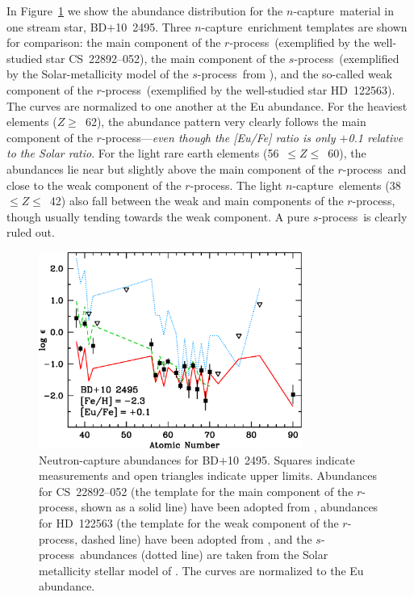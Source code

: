 \documentclass{emulateapj}
\def\rpro{\mbox{$r$-process}}
\def\spro{\mbox{$s$-process}}
\def\ncap{\mbox{$n$-capture}}
\begin{document}
In Figure~\ref{bdp102495plot} we show the abundance distribution
for the \ncap\ material in one stream star, \mbox{BD$+$10~2495}.
Three \ncap\ enrichment templates are shown for comparison:
the main component of the \rpro\ (exemplified by the 
well-studied star \mbox{CS~22892--052}),
the main component of the \spro\ (exemplified by the
Solar-metallicity model of the \spro\ from \citealt{arlandini99}),
and the so-called weak component of the \rpro\
(exemplified by the well-studied star \mbox{HD~122563}).
The curves are normalized to one another at the Eu abundance.
For the heaviest elements ($Z \geq$~62), the abundance pattern
very clearly follows the main component of the \rpro---\textit{even 
though the [Eu/Fe] ratio is only $+$0.1 relative to the Solar ratio}.
For the light rare earth elements (56~$\leq Z \leq$~60),
the abundances lie near but slightly above 
the main component of the \rpro\ and
close to the weak component of the \rpro.
The light \ncap\ elements (38~$\leq Z \leq$~42)
also fall between the weak and main components of the \rpro,
though usually tending towards the weak component.
A pure \spro\ is clearly ruled out.

\begin{figure}
\includegraphics[angle=0,width=3.4in]{fig12.eps}
\caption{
\label{bdp102495plot}
Neutron-capture abundances for \mbox{BD$+$10~2495}.
Squares indicate measurements and open triangles indicate upper limits.
Abundances for \mbox{CS~22892--052} (the template for the
main component of the \rpro, shown as a solid line) have been adopted from
\citet{sneden03a,sneden09}, abundances for \mbox{HD~122563}
(the template for the weak component of the \rpro, dashed line)
have been adopted from \citet{honda07},
and the \spro\ abundances (dotted line) are taken from the
Solar metallicity stellar model of \citet{arlandini99}.
The curves are normalized to the Eu abundance.
}
\end{figure}
\end{document}
